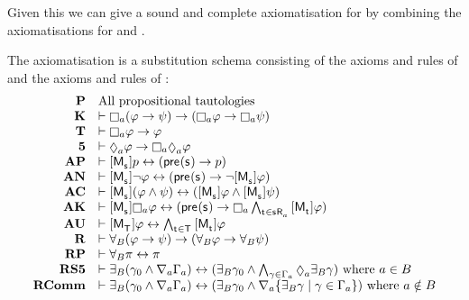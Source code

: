 Given this we can give a sound and complete axiomatisation for \logicRamlS{} by combining the axiomatisations for \logicAmlS{} and \logicRmlS{}.

\begin{definition}\label{raml-s5-axiomatisation}
The axiomatisation \axiomRamlS{} is a substitution schema consisting of the axioms and rules of \axiomAmlS{} and the axioms and rules of \axiomRmlS{}:
$$
\begin{array}{rl}
    {\bf P}     & \text{All propositional tautologies}\\
    {\bf K}     & \proves \necessaryA (\phi \implies \psi) \implies (\necessaryA \phi \implies \necessaryA \psi)\\
    {\bf T}     & \proves \necessaryA \phi \implies \phi\\
    {\bf 5}     & \proves \possibleA \phi \implies \necessaryA \possibleA \phi\\
    {\bf AP} & \proves \actionA{\aPModel{\aStateS}} \atomP \iff (\aPrecondition(\aStateS) \implies \atomP)\\
    {\bf AN} & \proves \actionA{\aPModel{\aStateS}} \lnot \phi \iff (\aPrecondition(\aStateS) \implies \lnot \actionA{\aPModel{\aStateS}} \phi)\\
    {\bf AC} & \proves \actionA{\aPModel{\aStateS}} (\phi \land \psi) \iff (\actionA{\aPModel{\aStateS}} \phi \land \actionA{\aPModel{\aStateS}} \psi)\\
    {\bf AK} & \proves \actionA{\aPModel{\aStateS}} \necessaryA \phi \iff (\aPrecondition(\aStateS) \implies \necessaryA \bigwedge_{\aStateT \in \aSuccessorsA{\aStateS}} \actionA{\aPModel{\aStateT}} \phi)\\
    {\bf AU} & \proves \actionA{\aPModel{\aStatesT}} \phi \iff \bigwedge_{\aStateT \in \aStatesT} \actionA{\aPModel{\aStateT}} \phi\\
    {\bf R} & \proves \allrefsBs (\phi \implies \psi) \implies (\allrefsBs \phi \implies \allrefsBs \psi)\\
    {\bf RP} & \proves \allrefsBs \pi \iff \pi\\
    {\bf RS5} & \proves \somerefsBs (\gamma_0 \land \coversA \Gamma_\agentA) \iff (\somerefsBs \gamma_0 \land \bigwedge_{\gamma \in \Gamma_\agentA} \possibleA \somerefsBs \gamma) \text{ where } \agentA \in \agentsB\\
    {\bf RComm} & \proves \somerefsBs (\gamma_0 \land \coversA \Gamma_\agentA) \iff (\somerefsBs \gamma_0 \land \coversA \{\somerefsBs \gamma \mid \gamma \in \Gamma_\agentA\}) \text{ where } \agentA \notin \agentsB\\

\end{array}$$
\end{definition}
